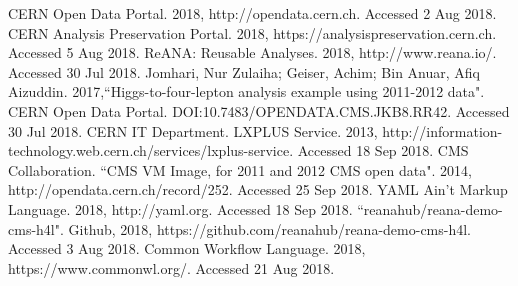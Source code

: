 \documentclass[letter]{article}
\begin{document}
\begin{thebibliography}{9}
\begin{small}
CERN Open Data Portal. 2018, http://opendata.cern.ch. Accessed 2 Aug 2018.
CERN Analysis Preservation Portal. 2018, https://analysispreservation.cern.ch. Accessed 5 Aug 2018.
ReANA: Reusable Analyses. 2018, http://www.reana.io/. Accessed 30 Jul 2018.
Jomhari, Nur Zulaiha; Geiser, Achim; Bin Anuar, Afiq Aizuddin. 2017,``Higgs-to-four-lepton analysis example using 2011-2012 data". CERN Open Data Portal. DOI:10.7483/OPENDATA.CMS.JKB8.RR42. Accessed 30 Jul 2018.
CERN IT Department. LXPLUS Service. 2013, http://information-technology.web.cern.ch/services/lxplus-service. Accessed 18 Sep 2018.
CMS Collaboration. ``CMS VM Image, for 2011 and 2012 CMS open data". 2014, http://opendata.cern.ch/record/252. Accessed 25 Sep 2018.
YAML Ain't Markup Language. 2018, http://yaml.org. Accessed 18 Sep 2018.
``reanahub/reana-demo-cms-h4l". Github, 2018, https://github.com/reanahub/reana-demo-cms-h4l. Accessed 3 Aug 2018.
Common Workflow Language. 2018, https://www.commonwl.org/. Accessed 21 Aug 2018.
\end{small}
\end{thebibliography}
\end{document}
